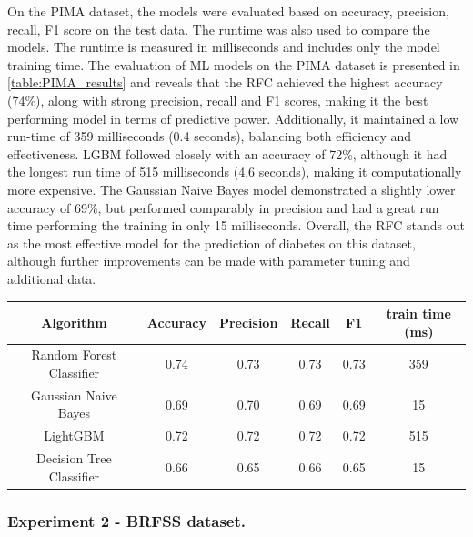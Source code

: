 \documentclass[runningheads]{llncs}
\begin{document}
On the PIMA dataset, the models were evaluated based on accuracy, precision, recall, F1 score on the test data. The runtime was also used to compare the models. The runtime is measured in milliseconds and includes only the model training time. 
The evaluation of ML models on the PIMA dataset is presented in \autoref{table:PIMA_results} and reveals that the RFC achieved the highest accuracy (74\%), along with strong precision, recall and F1 scores, making it the best performing model in terms of predictive power. Additionally, it maintained a low run-time of 359 milliseconds (0.4 seconds), balancing both efficiency and effectiveness.
LGBM followed closely with an accuracy of 72\%, although it had the longest run time of 515 milliseconds (4.6 seconds), making it computationally more expensive.
The Gaussian Naive Bayes model demonstrated a slightly lower accuracy of 69\%, but performed comparably in precision and had a great run time performing the training in only 15 milliseconds. 
Overall, the RFC stands out as the most effective model for the prediction of diabetes on this dataset, although further improvements can be made with parameter tuning and additional data.

\begin{center}
\begin{tabular}{ |c|c|c|c|c|c| } 
 \hline
 Algorithm & Accuracy & Precision & Recall & F1 & train time (ms) \\ 
 \hline\hline
 Random Forest Classifier &  {0.74} & 0.73 & 0.73 & 0.73 & 359 \\ 
 Gaussian Naive Bayes & 0.69 & 0.70 & 0.69 & 0.69 & 15  \\ 
 LightGBM & 0.72 & 0.72 & 0.72 & 0.72 & 515 \\ 
Decision Tree Classifier & 0.66 & 0.65 & 0.66 & 0.65 & 15 \\ 
 \hline
\end{tabular}
\label{table:PIMA_results}
\end{center}

\subsubsection{Experiment 2 - BRFSS dataset.} 
\end{document}
